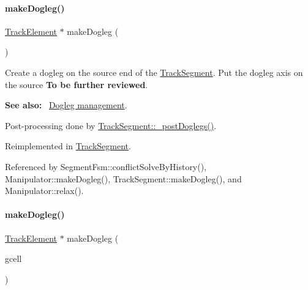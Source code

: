 \mbox{\label{classKite_1_1TrackElement_a7a9637875364e84e6862de0102341715}} 
\paragraph{\texorpdfstring{make\+Dogleg()}{makeDogleg()}\hspace{0.1cm}{\footnotesize\ttfamily [1/3]}}
{\footnotesize\ttfamily \hyperlink{classKite_1_1TrackElement}{Track\+Element} $\ast$ make\+Dogleg (\begin{DoxyParamCaption}{ }\end{DoxyParamCaption})\hspace{0.3cm}{\ttfamily [virtual]}}

Create a dogleg on the source end of the \hyperlink{classKite_1_1TrackSegment}{Track\+Segment}. Put the dogleg axis on the source {\bfseries To be further reviewed}.

{\bfseries See also\+:}~ \hyperlink{classKite_1_1TrackSegment_secDogleg}{Dogleg management}.

Post-\/processing done by \hyperlink{classKite_1_1TrackSegment_a10a45c049d0bd7d01c7eff1c5441c7a2}{Track\+Segment\+::\+\_\+post\+Doglegs()}. 

Reimplemented in \hyperlink{classKite_1_1TrackSegment_a7a9637875364e84e6862de0102341715}{Track\+Segment}.



Referenced by Segment\+Fsm\+::conflict\+Solve\+By\+History(), Manipulator\+::make\+Dogleg(), Track\+Segment\+::make\+Dogleg(), and Manipulator\+::relax().

\mbox{\label{classKite_1_1TrackElement_a3e1b4982a2427f74e55592520ab6272d}} 
\paragraph{\texorpdfstring{make\+Dogleg()}{makeDogleg()}\hspace{0.1cm}{\footnotesize\ttfamily [2/3]}}
{\footnotesize\ttfamily \hyperlink{classKite_1_1TrackElement}{Track\+Element} $\ast$ make\+Dogleg (\begin{DoxyParamCaption}\item[{\textbf{ Katabatic\+::\+G\+Cell} $\ast$}]{gcell }\end{DoxyParamCaption})\hspace{0.3cm}{\ttfamily [inline]}}

